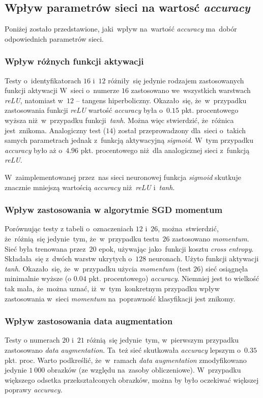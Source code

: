 \documentclass[11pt, a4paper]{article}
\begin{document}
 \subsection {Wpływ parametrów sieci na wartosć \textit{accuracy}}
 Poniżej zostało przedstawione, jaki~wpływ na~wartość \textit{accuracy} ma~dobór odpowiednich parametrów sieci.
 \subsubsection{Wpływ różnych funkcji aktywacji}
 Testy o~identyfikatorach $16$ i~$12$ różniły~się jedynie rodzajem zastosowanych funkcji aktywacji
 W~sieci o~numerze $16$ zastosowano we~wszystkich warstwach \textit{reLU}, natomiast w~$12$ -- tangens hiperboliczny.
 Okazało~się, że~w~przypadku zastosowania funkcji \textit{reLU} wartość \textit{accuracy} była o~$0.15$ pkt. procentowego wyższa niż~w~przypadku funkcji~\textit{tanh}.
 Można więc stwierdzić, że~różnica jest~znikoma. Analogiczny test ($14$) został przeprowadzony dla~sieci o~takich samych parametrach jednak z~funkcją aktywacyjną \textit{sigmoid}.
 W~tym przypadku \textit{accuracy} było aż o~$4.96$ pkt. procentowego niż~dla analogicznej sieci z~funkcją \textit{reLU}. 
 
W~zaimplementowanej przez~nas sieci neuronowej funkcja \textit{sigmoid} skutkuje znacznie mniejszą wartością \textit{accuracy} niż~\textit{reLU} i~\textit{tanh}.
 
 \subsubsection{Wpływ zastosowania w algorytmie SGD momentum}
 Porównując testy z tabeli o~oznaczeniach $12$ i~$26$, można~stwierdzić, że~różnią~się jedynie~tym, że~w~przypadku testu~$26$ zastosowano \textit{momentum}. 
 Sieć była trenowana przez~$20$ epok, używając jako~funkcji kosztu \textit{cross entropy}. Składała~się z~dwóch warstw ukrytych o~$128$ neuronach.
 Użyto funkcji aktywacji \textit{tanh}. 
 Okazało~się, że~w~przypadku użycia \textit{momentum} (test $26$) sieć osiągnęła minimalnie wyższe (o $0.04$ pkt. procentowego) \textit{accuracy}.
 Niemniej jest to wielkość tak mała, że~można uznać, iż~w~tym~konkretnym przypadku wpływ zastosowania w~sieci \textit{momentum} na~poprawność klasyfikacji jest znikomy. 
 
 \subsubsection{Wpływ zastosowania data augmentation} 
 Testy o numerach $20$ i~$21$ różnią~się jedynie~tym, w~pierwszym przypadku zastosowano \textit{data augmentation}. Ta~też sieć skutkowała \textit{accuracy} lepszym o~$0.35$ pkt. proc.
 Warto podkreślić, że~w~ramach \textit{data augmentation} zmodyfikowano jedynie $1\:000$ obrazków (ze względu na~zasoby obliczeniowe).
 W~przypadku większego odsetka przekształconych obrazków, można by było oczekiwać większej poprawy \textit{accuracy}.
 
\end{document}
